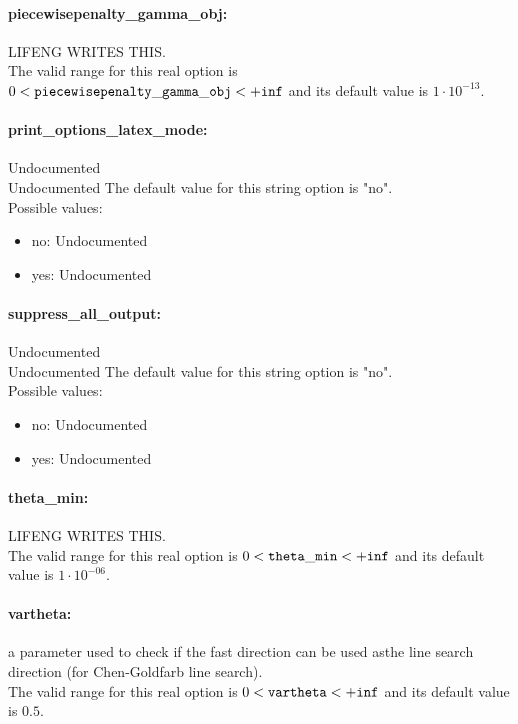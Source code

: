 \paragraph{piecewisepenalty\_gamma\_obj:}\label{sec:piecewisepenalty_gamma_obj} LIFENG WRITES THIS. $\;$ \\
 The valid range for this real option is 
$0 <  {\tt piecewisepenalty\_gamma\_obj } <  {\tt +inf}$
and its default value is $1 \cdot 10^{-13}$.


\paragraph{print\_options\_latex\_mode:}\label{sec:print_options_latex_mode} Undocumented $\;$ \\
 Undocumented
The default value for this string option is "no".
\\ 
Possible values:
\begin{itemize}
   \item no: Undocumented
   \item yes: Undocumented
\end{itemize}

\paragraph{suppress\_all\_output:}\label{sec:suppress_all_output} Undocumented $\;$ \\
 Undocumented
The default value for this string option is "no".
\\ 
Possible values:
\begin{itemize}
   \item no: Undocumented
   \item yes: Undocumented
\end{itemize}

\paragraph{theta\_min:}\label{sec:theta_min} LIFENG WRITES THIS. $\;$ \\
 The valid range for this real option is 
$0 <  {\tt theta\_min } <  {\tt +inf}$
and its default value is $1 \cdot 10^{-06}$.


\paragraph{vartheta:}\label{sec:vartheta} a parameter used to check if the fast direction can be used asthe line search direction (for Chen-Goldfarb line search). $\;$ \\
 The valid range for this real option is 
$0 <  {\tt vartheta } <  {\tt +inf}$
and its default value is $0.5$.


